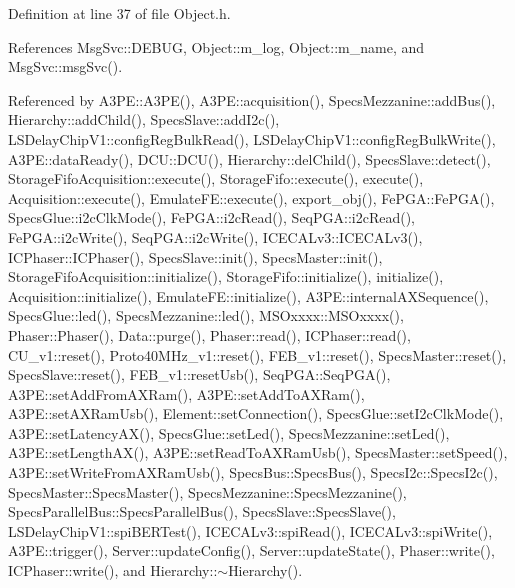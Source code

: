 Definition at line 37 of file Object.\+h.



References Msg\+Svc\+::\+D\+E\+B\+UG, Object\+::m\+\_\+log, Object\+::m\+\_\+name, and Msg\+Svc\+::msg\+Svc().



Referenced by A3\+P\+E\+::\+A3\+P\+E(), A3\+P\+E\+::acquisition(), Specs\+Mezzanine\+::add\+Bus(), Hierarchy\+::add\+Child(), Specs\+Slave\+::add\+I2c(), L\+S\+Delay\+Chip\+V1\+::config\+Reg\+Bulk\+Read(), L\+S\+Delay\+Chip\+V1\+::config\+Reg\+Bulk\+Write(), A3\+P\+E\+::data\+Ready(), D\+C\+U\+::\+D\+C\+U(), Hierarchy\+::del\+Child(), Specs\+Slave\+::detect(), Storage\+Fifo\+Acquisition\+::execute(), Storage\+Fifo\+::execute(), execute(), Acquisition\+::execute(), Emulate\+F\+E\+::execute(), export\+\_\+obj(), Fe\+P\+G\+A\+::\+Fe\+P\+G\+A(), Specs\+Glue\+::i2c\+Clk\+Mode(), Fe\+P\+G\+A\+::i2c\+Read(), Seq\+P\+G\+A\+::i2c\+Read(), Fe\+P\+G\+A\+::i2c\+Write(), Seq\+P\+G\+A\+::i2c\+Write(), I\+C\+E\+C\+A\+Lv3\+::\+I\+C\+E\+C\+A\+Lv3(), I\+C\+Phaser\+::\+I\+C\+Phaser(), Specs\+Slave\+::init(), Specs\+Master\+::init(), Storage\+Fifo\+Acquisition\+::initialize(), Storage\+Fifo\+::initialize(), initialize(), Acquisition\+::initialize(), Emulate\+F\+E\+::initialize(), A3\+P\+E\+::internal\+A\+X\+Sequence(), Specs\+Glue\+::led(), Specs\+Mezzanine\+::led(), M\+S\+Oxxxx\+::\+M\+S\+Oxxxx(), Phaser\+::\+Phaser(), Data\+::purge(), Phaser\+::read(), I\+C\+Phaser\+::read(), C\+U\+\_\+v1\+::reset(), Proto40\+M\+Hz\+\_\+v1\+::reset(), F\+E\+B\+\_\+v1\+::reset(), Specs\+Master\+::reset(), Specs\+Slave\+::reset(), F\+E\+B\+\_\+v1\+::reset\+Usb(), Seq\+P\+G\+A\+::\+Seq\+P\+G\+A(), A3\+P\+E\+::set\+Add\+From\+A\+X\+Ram(), A3\+P\+E\+::set\+Add\+To\+A\+X\+Ram(), A3\+P\+E\+::set\+A\+X\+Ram\+Usb(), Element\+::set\+Connection(), Specs\+Glue\+::set\+I2c\+Clk\+Mode(), A3\+P\+E\+::set\+Latency\+A\+X(), Specs\+Glue\+::set\+Led(), Specs\+Mezzanine\+::set\+Led(), A3\+P\+E\+::set\+Length\+A\+X(), A3\+P\+E\+::set\+Read\+To\+A\+X\+Ram\+Usb(), Specs\+Master\+::set\+Speed(), A3\+P\+E\+::set\+Write\+From\+A\+X\+Ram\+Usb(), Specs\+Bus\+::\+Specs\+Bus(), Specs\+I2c\+::\+Specs\+I2c(), Specs\+Master\+::\+Specs\+Master(), Specs\+Mezzanine\+::\+Specs\+Mezzanine(), Specs\+Parallel\+Bus\+::\+Specs\+Parallel\+Bus(), Specs\+Slave\+::\+Specs\+Slave(), L\+S\+Delay\+Chip\+V1\+::spi\+B\+E\+R\+Test(), I\+C\+E\+C\+A\+Lv3\+::spi\+Read(), I\+C\+E\+C\+A\+Lv3\+::spi\+Write(), A3\+P\+E\+::trigger(), Server\+::update\+Config(), Server\+::update\+State(), Phaser\+::write(), I\+C\+Phaser\+::write(), and Hierarchy\+::$\sim$\+Hierarchy().


